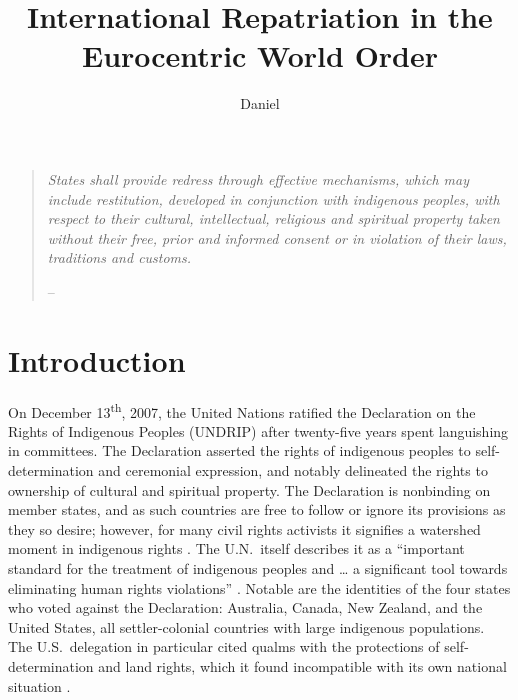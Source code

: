 \documentclass[american]{../../../coursework}
\title{International Repatriation in the Eurocentric World Order}
\subtitle{}
\author{Daniel}{Glenn}{Leonard}
\date{\displaydate{date}}
\begin{document}
\maketitle

\begin{quote}
    \centering\emph{States shall provide redress through effective
    mechanisms, which may include restitution, developed in conjunction with
    indigenous peoples, with respect to their cultural, intellectual,
    religious and spiritual property taken without their free, prior and
    informed consent or in violation of their laws, traditions and customs.}
    
    --~\textcite[Article 11, Section 2]{Uni07}
\end{quote}

\section{Introduction}

On December 13\textsuperscript{th}, 2007, the United Nations ratified the
Declaration on the Rights of Indigenous Peoples (UNDRIP) after twenty-five
years spent languishing in committees. The Declaration asserted the rights of
indigenous peoples to self-determination and ceremonial expression, and
notably delineated the rights to ownership of cultural and spiritual property.
The Declaration is nonbinding on member states, and as such countries are free
to follow or ignore its provisions as they so desire; however, for many civil
rights activists it signifies a watershed moment in indigenous rights
\parencite{Wei12}. The U.N.\ itself describes it as a ``important standard for
the treatment of indigenous peoples and … a significant tool towards
eliminating human rights violations'' \parencite[2]{UniFAQ}. Notable are the
identities of the four states who voted against the Declaration: Australia,
Canada, New Zealand, and the United States, all settler-colonial countries
with large indigenous populations. The U.S.\ delegation in particular cited
qualms with the protections of self-determination and land rights, which it
found incompatible with its own national situation \parencite{Uni071}.
\end{document}
